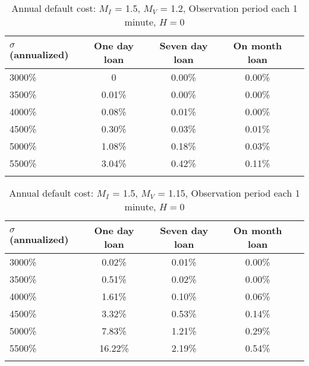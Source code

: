 \documentclass[12pt]{article}
\begin{document}
   \begin{table}[!ht]
     \caption{Annual default cost: $M_I$ = 1.5, $M_V$ = 1.2, Observation period each 1 minute, $H=0$ }\label{tab:defaultCost1}
     \centering
     \begin{tabularx}{\linewidth}{Xcccc}\toprule
       $\sigma$ (annualized) & One day loan  & Seven day loan & On month loan\\ \midrule
       
       3000\% & 0 & 0.00\% & 0.00\%   \\
       3500\% & 0.01\% & 0.00\% & 0.00\%   \\
       4000\% & 0.08\% & 0.01\% & 0.00\%   \\ 
       4500\% & 0.30\% & 0.03\% & 0.01\%   \\
       5000\% & 1.08\% & 0.18\% & 0.03\%   \\
       5500\% & 3.04\% & 0.42\% & 0.11\%   \\ 
       \addlinespace
     \end{tabularx}

   \end{table}


   \begin{table}[!ht]
     \caption{Annual default cost: $M_I$ = 1.5, $M_V$ = 1.15, Observation period each 1 minute, $H=0$}\label{tab:defaultCost2}
     \centering
     \begin{tabularx}{\linewidth}{Xcccc}\toprule
       $\sigma$ (annualized) & One day loan  & Seven day loan & On month loan\\ \midrule
       
       3000\% & 0.02\% & 0.01\% & 0.00\%   \\
       3500\% & 0.51\% & 0.02\% & 0.00\%   \\
       4000\% & 1.61\% & 0.10\% & 0.06\%   \\ 
       4500\% & 3.32\% & 0.53\% & 0.14\%   \\
       5000\% & 7.83\% & 1.21\% & 0.29\%   \\
       5500\% & 16.22\% & 2.19\% & 0.54\%   \\ 
       \addlinespace
     \end{tabularx}

   \end{table}



\singlespacing
\setlength\bibsep{0pt}


\end{document}
